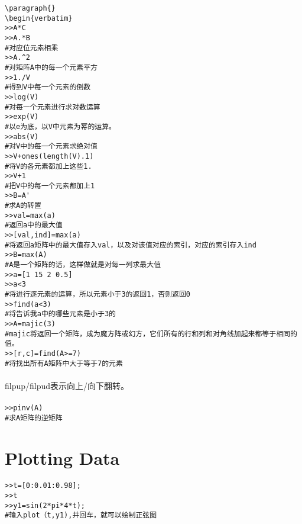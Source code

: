 \documentclass{article}
\begin{document}
\begin{CJK}{UTF8}{gbsn}
\begin{verbatim}
\paragraph{}
\begin{verbatim}
>>A*C
>>A.*B
#对应位元素相乘
>>A.^2
#对矩阵A中的每一个元素平方
>>1./V
#得到V中每一个元素的倒数
>>log(V)
#对每一个元素进行求对数运算
>>exp(V)
#以e为底，以V中元素为幂的运算。
>>abs(V)
#对V中的每一个元素求绝对值
>>V+ones(length(V).1)
#将V的各元素都加上这些1.
>>V+1
#把V中的每一个元素都加上1
>>B=A'
#求A的转置
>>val=max(a)
#返回a中的最大值
>>[val,ind]=max(a)
#将返回a矩阵中的最大值存入val，以及对该值对应的索引，对应的索引存入ind
>>B=max(A)
#A是一个矩阵的话，这样做就是对每一列求最大值
>>a=[1 15 2 0.5]
>>a<3
#将进行逐元素的运算，所以元素小于3的返回1，否则返回0
>>find(a<3)
#将告诉我a中的哪些元素是小于3的
>>A=majic(3)
#majic将返回一个矩阵，成为魔方阵或幻方，它们所有的行和列和对角线加起来都等于相同的值。
>>[r,c]=find(A>=7)
#将找出所有A矩阵中大于等于7的元素
\end{verbatim}
\paragraph{}
filpup/filpud表示向上/向下翻转。
\paragraph{}
\begin{verbatim}
>>pinv(A)
#求A矩阵的逆矩阵
\end{verbatim}
\section{Plotting Data}
\paragraph{}
\begin{verbatim}
>>t=[0:0.01:0.98];
>>t
>>y1=sin(2*pi*4*t);
#输入plot（t,y1),并回车，就可以绘制正弦图
\end{verbatim}

\end{CJK}
\end{document}

